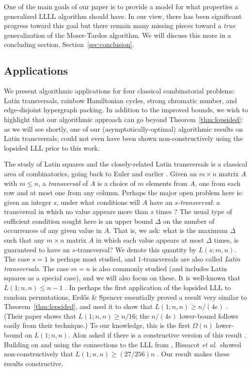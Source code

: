 One of the main goals of our paper is to provide a model for what properties a generalized LLLL algorithm should have. In our view, there has been significant progress toward this goal but there remain many missing pieces toward a \emph{true} generalization of the Moser-Tardos algorithm. We will discuss this more in a concluding section, Section~\ref{sec:conclusion}.


\subsection{Applications}
\label{sec:app-description}
We present algorithmic applications for four classical combinatorial problems: Latin transversals, rainbow Hamiltonian cycles, strong chromatic number, and edge-disjoint hypergraph packing. In addition to the improved bounds, we wish to highlight that our algorithmic approach can go beyond Theorem~\ref{thm:lopsided}: as we will see shortly, one of our (asymptotically-optimal) algorithmic results on Latin transversals, could not even have been shown non-constructively using the lopsided LLL prior to this work. 

The study of Latin squares and the closely-related Latin transversals is a classical area of combinatorics, going back to Euler and earlier \cite{denes-keedwell}. Given an $m \times n$ matrix $A$ with $m \leq n$, a \emph{transversal} of $A$ is a choice of $m$ elements from $A$, one from each row and at most one from any column. Perhaps the major open problem here is: given an integer $s$, under what conditions will $A$ have an \emph{$s$-transversal}: a transversal in which no value appears more than $s$ times \cite{bissacot,erdos-etal-latinsq,erdos-spencer,shor:latin,stein:latin,szabo:transversals}? The usual type of sufficient condition sought here is an upper bound $\Delta$ on the number of occurrences of any given value in $A$. That is, we ask: what is the maximum $\Delta$ such that any $m \times n$ matrix $A$ in which each value appears at most $\Delta$ times, is guaranteed to have an $s$-transversal? We denote this quantity by $L(s; m,n)$. The case $s = 1$ is perhaps most studied, and $1$-transversals are also called \emph{Latin transversals}. The case $m = n$ is also commonly studied (and includes Latin squares as a special case), and we will also focus on these. It is well-known that $L(1; n, n) \leq n - 1$ \cite{stein:latin}. In perhaps the first application of the lopsided LLL to random permutations, Erd\H{o}s \& Spencer essentially proved a result very similar to Theorem~\ref{thm:lopsided}, and used it to show that $L(1; n, n) \geq n/(4e)$ \cite{erdos-spencer}. (Their paper shows that $L(1; n, n) \geq n/16$; the $n/(4e)$ lower-bound follows easily from their technique.) To our knowledge, this is the first $\Omega(n)$ lower-bound on $L(1; n, n)$. Alon asked if there is a constructive version of this result \cite{alon:prob-proofs}. Building on \cite{erdos-spencer} and using the connections to the LLL from 
\cite{scott-sokal,shearer:lll}, Bissacot \emph{et al}.\ showed non-constructively that $L(1; n, n) \geq (27/256) n$ \cite{bissacot}. Our result makes these results constructive. 

